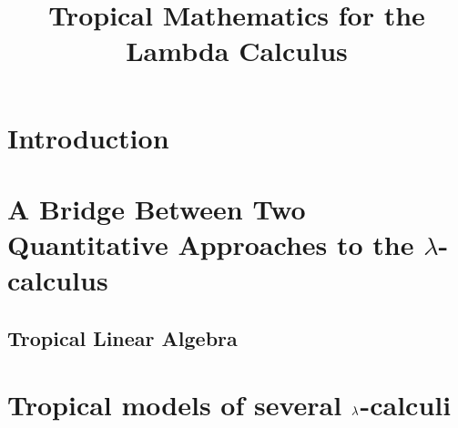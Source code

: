 \documentclass[conference]{IEEEtran}
\begin{document}
\title{Tropical Mathematics for the Lambda Calculus}

\author{
\and
{}
}

\maketitle

\begin{abstract}

\end{abstract}

\begin{IEEEkeywords}
\end{IEEEkeywords}

\section{Introduction}



\section{A Bridge Between Two Quantitative Approaches to the $\lambda$-calculus}



\subsection{Tropical Linear Algebra%
}

%

\section{Tropical models of several $\lambda$-calculi}
\end{document}
